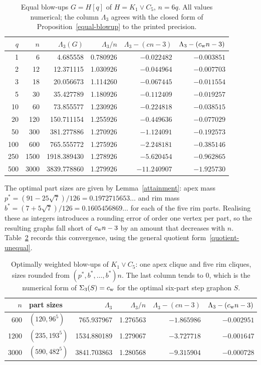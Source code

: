 \begin{table}[htbp]
\centering
\singlespacing
\caption{Equal blow-ups $G=H[q]$ of $H=K_1\vee C_5$, $n=6q$. All values
numerical; the column $\Lambda_3$ agrees with the closed form of
Proposition~\ref{equal-blowup} to the printed precision.}\label{tab-blowup}
\small
\begin{tabular}{@{}r r r r r r@{}}
\toprule
$q$ & $n$ & $\Lambda_3(G)$ & $\Lambda_3/n$ & $\Lambda_3-(cn-3)$ & $\Lambda_3-(c_{\mathrm{w}} n-3)$ \\
\midrule
1 & 6 & 4.685558 & 0.780926 & $-0.022482$ & $-0.003851$ \\
2 & 12 & 12.371115 & 1.030926 & $-0.044964$ & $-0.007703$ \\
3 & 18 & 20.056673 & 1.114260 & $-0.067445$ & $-0.011554$ \\
5 & 30 & 35.427789 & 1.180926 & $-0.112409$ & $-0.019257$ \\
10 & 60 & 73.855577 & 1.230926 & $-0.224818$ & $-0.038515$ \\
20 & 120 & 150.711154 & 1.255926 & $-0.449636$ & $-0.077029$ \\
50 & 300 & 381.277886 & 1.270926 & $-1.124091$ & $-0.192573$ \\
100 & 600 & 765.555772 & 1.275926 & $-2.248181$ & $-0.385146$ \\
250 & 1500 & 1918.389430 & 1.278926 & $-5.620454$ & $-0.962865$ \\
500 & 3000 & 3839.778860 & 1.279926 & $-11.240907$ & $-1.925730$ \\
\bottomrule
\end{tabular}
\end{table}

The optimal part sizes are given by Lemma~\ref{attainment}: apex mass
$p^*=(91-25\sqrt7)/126=0.1972715653\ldots$ and rim mass
$b^*=(7+5\sqrt7)/126=0.1605456869\ldots$ for each of the five rim parts.
Realising these as integers introduces a rounding error of order one vertex per
part, so the resulting graphs fall short of $c_{\mathrm{w}} n-3$ by an amount that
decreases with $n$. Table~\ref{tab-optblowup} records this convergence, using
the general quotient form~\eqref{quotient-unequal}.

\begin{table}[htbp]
\centering
\singlespacing
\caption{Optimally weighted blow-ups of $K_1\vee C_5$: one apex clique and
five rim cliques, sizes rounded from $(p^*,b^*,\ldots,b^*)n$. The last column
tends to $0$, which is the numerical form of $\Sigma_3(S)=c_{\mathrm{w}}$ for the
optimal six-part step graphon $S$.}\label{tab-optblowup}
\small
\begin{tabular}{@{}r l r r r r@{}}
\toprule
$n$ & part sizes & $\Lambda_3$ & $\Lambda_3/n$ & $\Lambda_3-(cn-3)$ & $\Lambda_3-(c_{\mathrm{w}} n-3)$ \\
\midrule
600 & $(120,96^5)$ & 765.937967 & 1.276563 & $-1.865986$ & $-0.002951$ \\
1200 & $(235,193^5)$ & 1534.880189 & 1.279067 & $-3.727718$ & $-0.001647$ \\
3000 & $(590,482^5)$ & 3841.703863 & 1.280568 & $-9.315904$ & $-0.000728$ \\
\bottomrule
\end{tabular}
\end{table}

